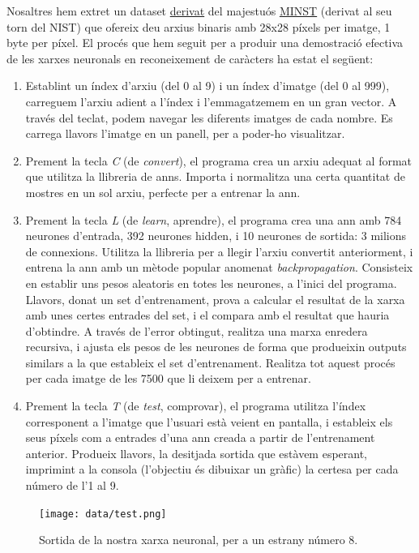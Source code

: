 Nosaltres hem extret un dataset \href{http://cis.jhu.edu/~sachin/digit/digit.html}{derivat} del majestuós \href{http://yann.lecun.com/exdb/mnist/}{MINST} (derivat al seu torn del NIST)
que ofereix deu arxius binaris amb 28x28 píxels per imatge, 1 byte per píxel. El procés que hem seguit per a produir una demostració efectiva de les 
xarxes neuronals en reconeixement de caràcters ha estat el següent:

\begin{enumerate}
\item Establint un índex d'arxiu (del 0 al 9) i un índex d'imatge (del 0 al 999), carreguem l'arxiu adient a l'índex i l'emmagatzemem en un gran vector. A través del teclat, podem
navegar les diferents imatges de cada nombre. Es carrega llavors l'imatge en un panell, per a poder-ho visualitzar.
\item Prement la tecla \emph{C} (de \emph{convert}), el programa crea un arxiu adequat al format que utilitza la llibreria de \ac{ann}s. Importa i normalitza una certa quantitat 
de mostres en un sol arxiu, perfecte per a entrenar la \ac{ann}.
\item Prement la tecla \emph{L} (de \emph{learn}, aprendre), el programa crea una \ac{ann} amb 784 neurones d'entrada, 392 neurones hidden, i 10 neurones de sortida: 3 milions de connexions. Utilitza la 
llibreria per a llegir l'arxiu convertit anteriorment, i entrena la \ac{ann} amb un mètode popular anomenat \emph{backpropagation}. Consisteix en establir uns pesos aleatoris 
en totes les neurones, a l'inici del programa. Llavors, donat un set d'entrenament, prova a calcular el resultat de la xarxa amb unes certes entrades del set, i el compara amb el resultat
que hauria d'obtindre. A través de l'error obtingut, realitza una marxa enredera recursiva, i ajusta els pesos de les neurones de forma que produeixin outputs similars a la que
estableix el set d'entrenament. Realitza tot aquest procés per cada imatge de les 7500 que li deixem per a entrenar.
\item Prement la tecla \emph{T} (de \emph{test}, comprovar), el programa utilitza l'índex corresponent a l'imatge que l'usuari està veient en pantalla, i estableix els seus píxels
com a entrades d'una \ac{ann} creada a partir de l'entrenament anterior. Produeix llavors, la desitjada sortida que estàvem esperant, imprimint a la consola (l'objectiu és dibuixar un gràfic)
la certesa per cada número de l'1 al 9.
\end{enumerate}


\begin{figure}[ht!]
\centering
\texttt{[image: data/test.png]}
\caption{Sortida de la nostra xarxa neuronal, per a un estrany número 8.}
\label{output}
\end{figure}

